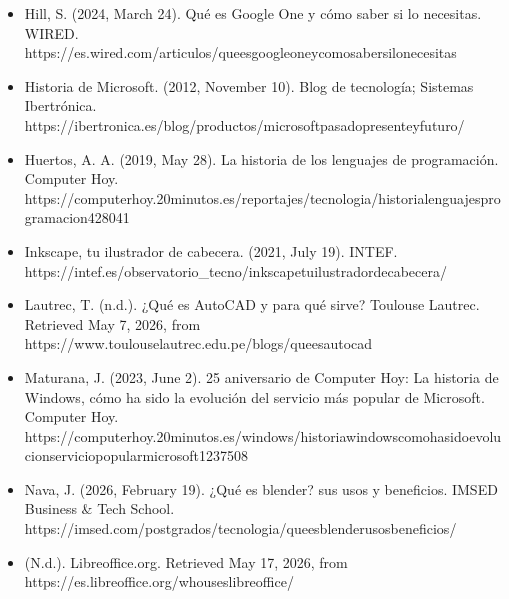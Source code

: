 \documentclass[letterpaper,10pt,spanish]{sphinxmanual}
\begin{document}
\begin{itemize}
\item {} 
\sphinxAtStartPar
Hill, S. (2024, March 24). Qué es Google One y cómo saber si lo necesitas. WIRED. https://es.wired.com/articulos/que\sphinxhyphen{}es\sphinxhyphen{}google\sphinxhyphen{}one\sphinxhyphen{}y\sphinxhyphen{}como\sphinxhyphen{}saber\sphinxhyphen{}si\sphinxhyphen{}lo\sphinxhyphen{}necesitas

\item {} 
\sphinxAtStartPar
Historia de Microsoft. (2012, November 10). Blog de tecnología; Sistemas Ibertrónica. https://ibertronica.es/blog/productos/microsoft\sphinxhyphen{}pasado\sphinxhyphen{}presente\sphinxhyphen{}y\sphinxhyphen{}futuro/

\item {} 
\sphinxAtStartPar
Huertos, A. A. (2019, May 28). La historia de los lenguajes de programación. Computer Hoy. https://computerhoy.20minutos.es/reportajes/tecnologia/historia\sphinxhyphen{}lenguajes\sphinxhyphen{}programacion\sphinxhyphen{}428041

\item {} 
\sphinxAtStartPar
Inkscape, tu ilustrador de cabecera. (2021, July 19). INTEF. https://intef.es/observatorio\_tecno/inkscape\sphinxhyphen{}tu\sphinxhyphen{}ilustrador\sphinxhyphen{}de\sphinxhyphen{}cabecera/

\item {} 
\sphinxAtStartPar
Lautrec, T. (n.d.). ¿Qué es AutoCAD y para qué sirve? Toulouse Lautrec. Retrieved May 7, 2026, from https://www.toulouselautrec.edu.pe/blogs/que\sphinxhyphen{}es\sphinxhyphen{}autocad

\item {} 
\sphinxAtStartPar
Maturana, J. (2023, June 2). 25 aniversario de Computer Hoy: La historia de Windows, cómo ha sido la evolución del servicio más popular de Microsoft. Computer Hoy. https://computerhoy.20minutos.es/windows/historia\sphinxhyphen{}windows\sphinxhyphen{}como\sphinxhyphen{}ha\sphinxhyphen{}sido\sphinxhyphen{}evolucion\sphinxhyphen{}servicio\sphinxhyphen{}popular\sphinxhyphen{}microsoft\sphinxhyphen{}1237508

\item {} 
\sphinxAtStartPar
Nava, J. (2026, February 19). ¿Qué es blender? sus usos y beneficios. IMSED Business \& Tech School. https://imsed.com/postgrados/tecnologia/que\sphinxhyphen{}es\sphinxhyphen{}blender\sphinxhyphen{}usos\sphinxhyphen{}beneficios/

\item {} 
\sphinxAtStartPar
(N.d.). Libreoffice.org. Retrieved May 17, 2026, from https://es.libreoffice.org/who\sphinxhyphen{}uses\sphinxhyphen{}libreoffice/


\end{itemize}
\end{document}
